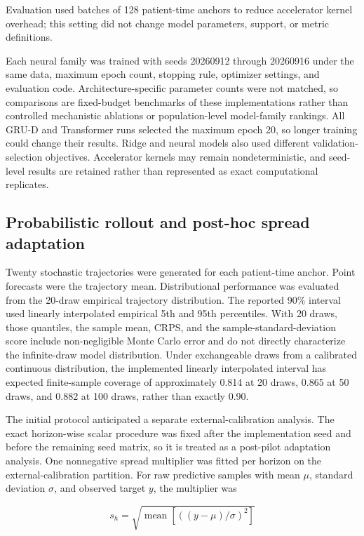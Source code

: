 \documentclass[conference]{IEEEtran}
\begin{document}
Evaluation used batches of 128 patient-time anchors to reduce accelerator
kernel overhead; this setting did not change model parameters, support, or
metric definitions.

Each neural family was trained with seeds 20260912 through 20260916 under the
same data, maximum epoch count, stopping rule, optimizer settings, and
evaluation code. Architecture-specific parameter counts were not matched, so
comparisons are fixed-budget benchmarks of these implementations rather than
controlled mechanistic ablations or population-level model-family rankings.
All GRU-D and Transformer runs selected the maximum epoch 20, so longer
training could change their results. Ridge and neural models also used
different validation-selection objectives. Accelerator kernels may remain
nondeterministic, and seed-level results are retained rather than represented
as exact computational replicates.

\subsection{Probabilistic rollout and post-hoc spread adaptation}\label{probabilistic-rollout-and-post-hoc-spread-adaptation}

Twenty stochastic trajectories were generated for each patient-time anchor.
Point forecasts were the trajectory mean. Distributional performance was
evaluated from the 20-draw empirical trajectory distribution. The reported
90\% interval used linearly interpolated empirical 5th and 95th percentiles.
With 20 draws, those quantiles, the sample mean, CRPS, and the
sample-standard-deviation score include non-negligible Monte Carlo error and
do not directly characterize the infinite-draw model distribution. Under
exchangeable draws from a calibrated continuous distribution, the implemented
linearly interpolated interval has expected finite-sample coverage of
approximately 0.814 at 20 draws, 0.865 at 50 draws, and 0.882 at 100 draws,
rather than exactly 0.90.

The initial protocol anticipated a separate external-calibration analysis. The
exact horizon-wise scalar procedure was fixed after the implementation seed
and before the remaining seed matrix, so it is treated as a post-pilot
adaptation analysis. One nonnegative spread multiplier was fitted per horizon
on the external-calibration partition. For raw predictive samples
with mean \(\mu\), standard deviation \(\sigma\), and observed target \(y\), the
multiplier was

\[
s_h = \sqrt{\operatorname{mean}\left[\left((y-\mu)/\sigma\right)^2\right]}
\]
\end{document}
